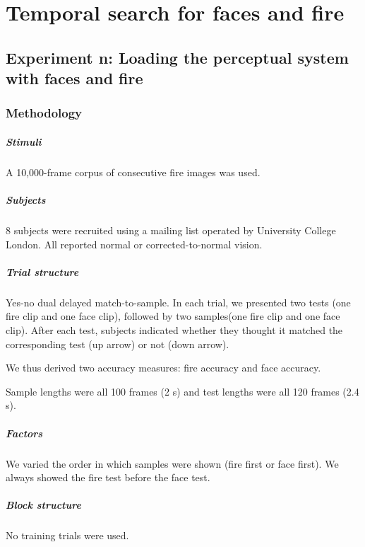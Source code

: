 \chapter{Temporal search for faces and fire}


\section{Experiment n: Loading the perceptual system with faces and fire}

\subsection{Methodology}

\paragraph{Stimuli}

A 10,000-frame corpus of consecutive fire images was used.



\paragraph{Subjects}

8 subjects were recruited using a mailing list operated by University College London. All reported normal or corrected-to-normal vision.

\paragraph{Trial structure}

Yes-no dual delayed match-to-sample.
In each trial, we presented two tests (one fire clip and one face clip), followed by two samples(one fire clip and one face clip). After each test, subjects indicated whether they thought it matched the corresponding test (up arrow) or not (down arrow).

We thus derived two accuracy measures: fire accuracy and face accuracy.

Sample lengths were all 100 frames (2 s) and test lengths were all 120 frames (2.4 s).

\paragraph{Factors}

We varied the order in which samples were shown (fire first or face first).
We always showed the fire test before the face test.

\paragraph{Block structure}

No training trials were used.
